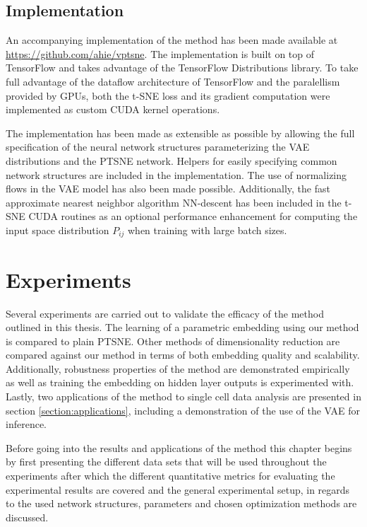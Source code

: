 \section{Implementation}
\label{section:implementation}

An accompanying implementation of the method has been made available at \url{https://github.com/ahie/vptsne}. The implementation is built on top of TensorFlow \cite{tensorflow} and takes advantage of the TensorFlow Distributions \cite{tensorflow_distributions} library. To take full advantage of the dataflow architecture of TensorFlow and the paralellism provided by GPUs, both the t-SNE loss and its gradient computation were implemented as custom CUDA \cite{cuda} kernel operations.

The implementation has been made as extensible as possible by allowing the full specification of the neural network structures parameterizing the VAE distributions and the PTSNE network. Helpers for easily specifying common network structures are included in the implementation. The use of normalizing flows in the VAE model has also been made possible. Additionally, the fast approximate nearest neighbor algorithm NN-descent \cite{nn_descent} has been included in the t-SNE CUDA routines as an optional performance enhancement for computing the input space distribution $P_{ij}$ when training with large batch sizes.

\chapter{Experiments}
\label{ch:experiments}

Several experiments are carried out to validate the efficacy of the method outlined in this thesis. The learning of a parametric embedding using our method is compared to plain PTSNE. Other methods of dimensionality reduction are compared against our method in terms of both embedding quality and scalability. Additionally, robustness properties of the method are demonstrated empirically as well as training the embedding on hidden layer outputs is experimented with. Lastly, two applications of the method to single cell data analysis are presented in section \ref{section:applications}, including a demonstration of the use of the VAE for inference.

Before going into the results and applications of the method this chapter begins by first presenting the different data sets that will be used throughout the experiments after which the different quantitative metrics for evaluating the experimental results are covered and the general experimental setup, in regards to the used network structures, parameters and chosen optimization methods are discussed.

